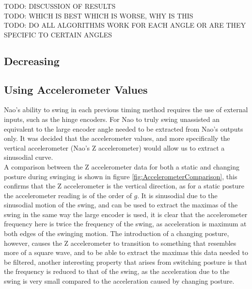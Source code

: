 \documentclass[11pt]{article}
\newcommand*\ruleline[1]{\par\noindent\raisebox{.8ex}{\makebox[\linewidth]{\hrulefill\hspace{1ex}\raisebox{-.8ex}{#1}\hspace{1ex}\hrulefill}}}
\begin{document}
TODO: DISCUSSION OF RESULTS\\
TODO: WHICH IS BEST WHICH IS WORSE, WHY IS THIS\\
TODO: DO ALL ALGORITHMS WORK FOR EACH ANGLE OR ARE THEY SPECIFIC TO CERTAIN ANGLES\\

\clearpage

\subsection{Decreasing}

\subsection{Using Accelerometer Values}
\ruleline{George Sheppard}
Nao's ability to swing in each previous timing method requires the use of external inputs, such as the hinge encoders. For Nao to truly swing unassisted an equivalent to the large encoder angle needed to be extracted from Nao's outputs only. It was decided that the accelerometer values, and more specifically the vertical accelerometer (Nao's Z accelerometer) would allow us to extract a sinusodial curve.\\

A comparison between the Z accelerometer data for both a static and changing posture during swinging is shown in figure \ref{fig:AccelerometerComparison}, this confirms that the Z accelerometer is the vertical direction, as for a static posture the accelerometer reading is of the order of $g$. It is sinusodial due to the sinusodial motion of the swing, and can be used to extract the maximas of the swing in the same way the large encoder is used, it is clear that the accelerometer frequency here is twice the frequency of the swing, as acceleration is maximum at both edges of the swinging motion. The introduction of a changing posture, however, causes the Z accelerometer to transition to something that resembles more of a square wave, and to be able to extract the maximas this data needed to be filtered, another interesting property that arises from switching posture is that the frequency is reduced to that of the swing, as the acceleration due to the swing is very small compared to the acceleration caused by changing posture.\\
\end{document}
